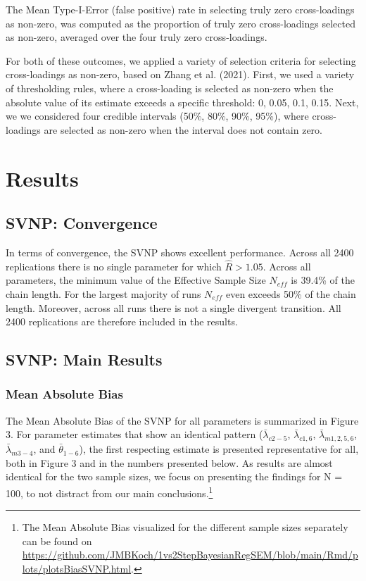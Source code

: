 \documentclass[
  man, donotrepeattitle,floatsintext]{apa6}
\begin{document}
The Mean Type-I-Error (false positive) rate in selecting truly zero cross-loadings as non-zero, was computed as the proportion of truly zero cross-loadings selected as non-zero, averaged over the four truly zero cross-loadings.

For both of these outcomes, we applied a variety of selection criteria for selecting cross-loadings as non-zero, based on Zhang et al. (2021). First, we used a variety of thresholding rules, where a cross-loading is selected as non-zero when the absolute value of its estimate exceeds a specific threshold: 0, 0.05, 0.1, 0.15. Next, we we considered four credible intervals (50\%, 80\%, 90\%, 95\%), where cross-loadings are selected as non-zero when the interval does not contain zero.

\hypertarget{results}{%
\section{Results}\label{results}}

\hypertarget{svnp-convergence}{%
\subsection{SVNP: Convergence}\label{svnp-convergence}}

In terms of convergence, the SVNP shows excellent performance. Across all 2400 replications there is no single parameter for which \(\hat{R} > 1.05\). Across all parameters, the minimum value of the Effective Sample Size \(N_{eff}\) is 39.4\% of the chain length. For the largest majority of runs \(N_{eff}\) even exceeds 50\% of the chain length. Moreover, across all runs there is not a single divergent transition. All 2400 replications are therefore included in the results.

\hypertarget{svnp-main-results}{%
\subsection{SVNP: Main Results}\label{svnp-main-results}}

\hypertarget{mean-absolute-bias-1}{%
\subsubsection{Mean Absolute Bias}\label{mean-absolute-bias-1}}

The Mean Absolute Bias of the SVNP for all parameters is summarized in Figure 3. For parameter estimates that show an identical pattern (\(\bar{\lambda}_{c 2-5}\), \(\bar{\lambda}_{c 1, 6}\), \(\bar{\lambda}_{m 1, 2, 5, 6}\), \(\bar{\lambda}_{m 3-4}\), and \(\bar{\theta}_{1-6}\)), the first respecting estimate is presented representative for all, both in Figure 3 and in the numbers presented below. As results are almost identical for the two sample sizes, we focus on presenting the findings for N = 100, to not distract from our main conclusions.\footnote{The Mean Absolute Bias visualized for the different sample sizes separately can be found on \url{https://github.com/JMBKoch/1vs2StepBayesianRegSEM/blob/main/Rmd/plots/plotsBiasSVNP.html}.}
\end{document}

